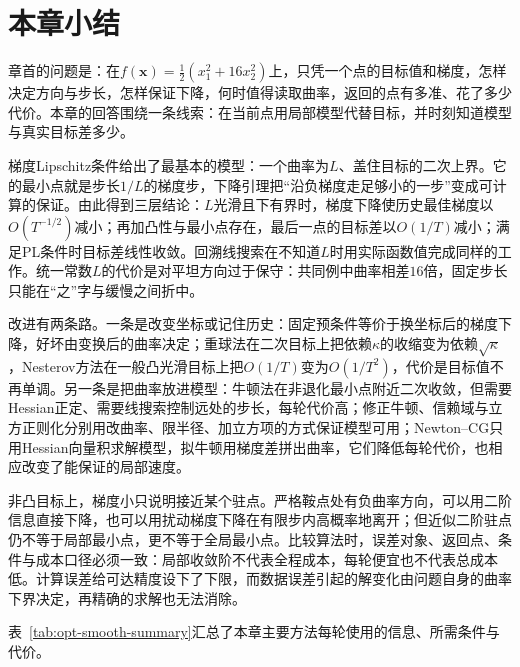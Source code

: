 \section{本章小结}
\label{sec:opt-smooth-summary}

章首的问题是：在$f(\bm x)=\tfrac12(x_1^2+16x_2^2)$上，只凭一个点的目标值和梯度，怎样决定方向与步长，怎样保证下降，何时值得读取曲率，返回的点有多准、花了多少代价。本章的回答围绕一条线索：在当前点用局部模型代替目标，并时刻知道模型与真实目标差多少。

梯度Lipschitz条件给出了最基本的模型：一个曲率为$L$、盖住目标的二次上界。它的最小点就是步长$1/L$的梯度步，下降引理把“沿负梯度走足够小的一步”变成可计算的保证。由此得到三层结论：$L$光滑且下有界时，梯度下降使历史最佳梯度以$O(T^{-1/2})$减小；再加凸性与最小点存在，最后一点的目标差以$O(1/T)$减小；满足PL条件时目标差线性收敛。回溯线搜索在不知道$L$时用实际函数值完成同样的工作。统一常数$L$的代价是对平坦方向过于保守：共同例中曲率相差$16$倍，固定步长只能在“之”字与缓慢之间折中。

改进有两条路。一条是改变坐标或记住历史：固定预条件等价于换坐标后的梯度下降，好坏由变换后的曲率决定；重球法在二次目标上把依赖$\kappa$的收缩变为依赖$\sqrt\kappa$，Nesterov方法在一般凸光滑目标上把$O(1/T)$变为$O(1/T^2)$，代价是目标值不再单调。另一条是把曲率放进模型：牛顿法在非退化最小点附近二次收敛，但需要Hessian正定、需要线搜索控制远处的步长，每轮代价高；修正牛顿、信赖域与立方正则化分别用改曲率、限半径、加立方项的方式保证模型可用；Newton--CG只用Hessian向量积求解模型，拟牛顿用梯度差拼出曲率，它们降低每轮代价，也相应改变了能保证的局部速度。

非凸目标上，梯度小只说明接近某个驻点。严格鞍点处有负曲率方向，可以用二阶信息直接下降，也可以用扰动梯度下降在有限步内高概率地离开；但近似二阶驻点仍不等于局部最小点，更不等于全局最小点。比较算法时，误差对象、返回点、条件与成本口径必须一致：局部收敛阶不代表全程成本，每轮便宜也不代表总成本低。计算误差给可达精度设下了下限，而数据误差引起的解变化由问题自身的曲率下界决定，再精确的求解也无法消除。

表~\ref{tab:opt-smooth-summary}汇总了本章主要方法每轮使用的信息、所需条件与代价。

